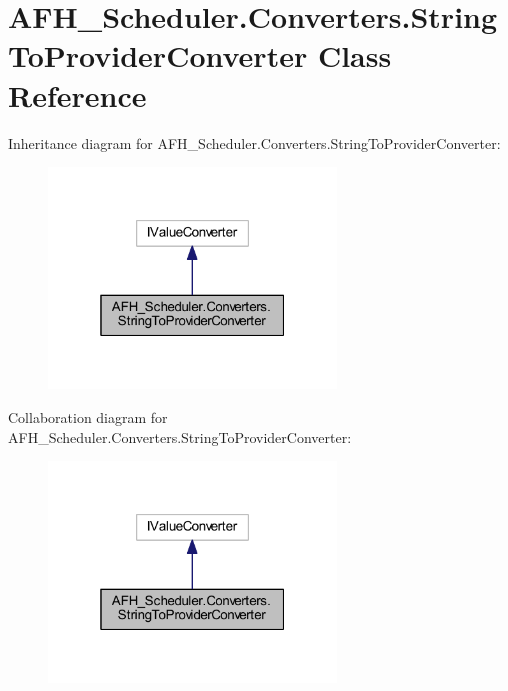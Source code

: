 \section{A\+F\+H\+\_\+\+Scheduler.\+Converters.\+String\+To\+Provider\+Converter Class Reference}
\label{class_a_f_h___scheduler_1_1_converters_1_1_string_to_provider_converter}


Inheritance diagram for A\+F\+H\+\_\+\+Scheduler.\+Converters.\+String\+To\+Provider\+Converter\+:
\nopagebreak
\begin{figure}[H]
\begin{center}
\leavevmode
\includegraphics[width=217pt]{class_a_f_h___scheduler_1_1_converters_1_1_string_to_provider_converter__inherit__graph}
\end{center}
\end{figure}


Collaboration diagram for A\+F\+H\+\_\+\+Scheduler.\+Converters.\+String\+To\+Provider\+Converter\+:
\nopagebreak
\begin{figure}[H]
\begin{center}
\leavevmode
\includegraphics[width=217pt]{class_a_f_h___scheduler_1_1_converters_1_1_string_to_provider_converter__coll__graph}
\end{center}
\end{figure}
